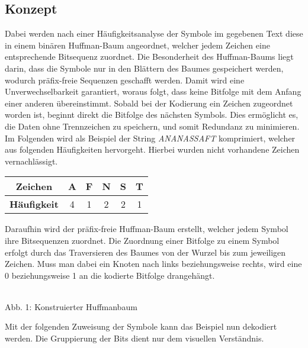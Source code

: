 \documentclass[course=erap]{aspdoc}
\begin{document}
\subsection{Konzept}
Dabei werden nach einer Häufigkeitsanalyse der Symbole im gegebenen Text diese in einem binären Huffman-Baum angeordnet, welcher jedem Zeichen eine entsprechende Bitsequenz zuordnet. Die Besonderheit des Huffman-Baums liegt darin, dass die Symbole nur in den Blättern des Baumes gespeichert werden, wodurch präfix-freie Sequenzen geschafft werden. Damit wird eine Unverwechselbarkeit garantiert, woraus folgt, dass keine Bitfolge mit dem Anfang einer anderen übereinstimmt. Sobald bei der Kodierung ein Zeichen zugeordnet worden ist, beginnt direkt die Bitfolge des nächsten Symbols. Dies ermöglicht es, die Daten ohne Trennzeichen zu speichern, und somit Redundanz zu minimieren.\\
Im Folgenden wird als Beispiel der String \textit{ANANASSAFT} komprimiert, welcher aus folgenden Häufigkeiten hervorgeht. Hierbei wurden nicht vorhandene Zeichen vernachlässigt.\\
\begin{center}
    \begin{tabular}{ c|c|c|c|c|c } 
     \textbf{Zeichen} & A & F & N & S & T \\ 
     \hline
     \textbf{Häufigkeit} & 4 & 1 & 2 & 2 & 1 \\
    \end{tabular}
\end{center}
Daraufhin wird der präfix-freie Huffman-Baum erstellt, welcher jedem Symbol ihre Bitsequenzen zuordnet. Die Zuordnung einer Bitfolge zu einem Symbol erfolgt durch das Traversieren %
des Baumes von der Wurzel bis zum jeweiligen Zeichen. Muss man dabei ein Knoten nach links beziehungsweise rechts, wird eine 0 beziehungsweise 1 an die kodierte Bitfolge drangehängt.
\begin{center}
    \\Abb. 1: Konstruierter Huffmanbaum
    \label{fig:my_label}
\end{center}
Mit der folgenden Zuweisung der Symbole kann das Beispiel nun dekodiert werden. Die Gruppierung der Bits dient nur dem visuellen Verständnis.
\end{document}
